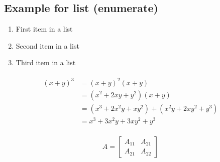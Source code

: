 \documentclass[paper=a4, fontsize=11pt]{scrartcl}
\numberwithin{equation}{section}		%
\numberwithin{figure}{section}			%
\numberwithin{table}{section}			%
\begin{document}
	\subsection{Example for list (enumerate)}
	\begin{enumerate}
		\item First item in a list 
		\item Second item in a list 
		\item Third item in a list
	\end{enumerate}
	
	\begin{align} 
	\begin{split}
	(x+y)^3 	&= (x+y)^2(x+y)\\
	&=(x^2+2xy+y^2)(x+y)\\
	&=(x^3+2x^2y+xy^2) + (x^2y+2xy^2+y^3)\\
	&=x^3+3x^2y+3xy^2+y^3
	\end{split}					
	\end{align}
	
	\begin{align}
	A = 
	\begin{bmatrix}
	A_{11} & A_{21} \\
	A_{21} & A_{22}
	\end{bmatrix}
	\end{align}
	



\end{document}
